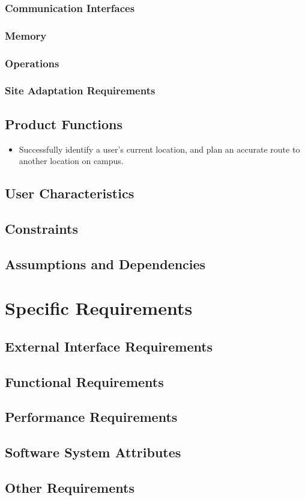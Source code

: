 \documentclass[10pt,a4paper]{article}
\begin{document}
			\subsubsection{Communication Interfaces}
			
			\subsubsection{Memory}
			
			\subsubsection{Operations}
			
			\subsubsection{Site Adaptation Requirements}
		
		\subsection{Product Functions}
		
			\begin{itemize}
				\item Successfully identify a user's current location, and plan an accurate route to another location on campus.
			\end{itemize}
		
		\subsection{User Characteristics}
		
		\subsection{Constraints}
		
		\subsection{Assumptions and Dependencies}
	
	
	\section{Specific Requirements}
	
		\subsection{External Interface Requirements}
		
		\subsection{Functional Requirements}
		
		\subsection{Performance Requirements}
		
			
		
		\subsection{Software System Attributes}
		
		\subsection{Other Requirements}
\end{document}
